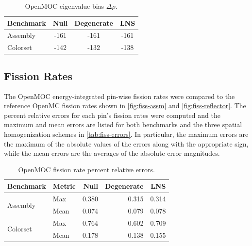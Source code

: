 \begin{table}[h!]
  \centering
  \caption{OpenMOC eigenvalue bias $\Delta\rho$.}
  \label{tab:keff-bias}
  \begin{tabular}{l c c c}
  \toprule
  \textbf{Benchmark} & \textbf{Null} & \textbf{Degenerate} & \textbf{LNS} \\
  \midrule
  Assembly & -161 & -161 & -161 \\
  Colorset & -142 & -132 & -138 \\
  \bottomrule
\end{tabular}
\end{table}


\subsection{Fission Rates}
\label{subsec:fiss-rates}

The OpenMOC energy-integrated pin-wise fission rates were compared to the reference OpenMC fission rates shown in \autoref{fig:fiss-assm} and \autoref{fig:fiss-reflector}. The percent relative errors for each pin's fission rates were computed and the maximum and mean errors are listed for both benchmarks and the three spatial homogenization schemes in \autoref{tab:fiss-errors}. In particular, the maximum errors are the maximum of the absolute values of the errors along with the appropriate sign, while the mean errors are the averages of the absolute error magnitudes.

\begin{table}[h!]
  \centering
  \caption{OpenMOC fission rate percent relative errors.}
  \label{tab:fiss-errors}
  \begin{tabular}{l l r r r}
  \toprule
  \textbf{Benchmark} & \textbf{Metric} & \textbf{Null} & \textbf{Degenerate} & \textbf{LNS} \\
  \midrule
  \multirow{2}{*}{Assembly} & Max  & 0.380 & 0.315 & 0.314 \\
                            & Mean & 0.074 & 0.079 & 0.078 \\
  \midrule
  \multirow{2}{*}{Colorset} & Max  & 0.764 & 0.602 & 0.709 \\
                            & Mean & 0.178 & 0.138 & 0.155 \\
  \bottomrule
\end{tabular}
\end{table}

